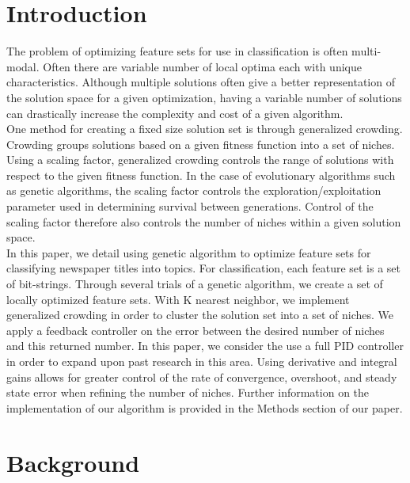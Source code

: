 \documentclass{sig-alternate}
\begin{document}


\section{Introduction}
The problem of optimizing feature sets for use in classification is often multi-modal. Often there are variable number of local optima each with unique characteristics. Although multiple solutions often give a better representation of the solution space for a given optimization, having a variable number of solutions can drastically increase the complexity and cost of a given algorithm.\\
\indent One method for creating a fixed size solution set is through generalized crowding. Crowding groups solutions based on a given fitness function into a set of niches\cite{ole:feedback}. Using a scaling factor, generalized crowding controls the range of solutions  with respect to the given fitness function. In the case of evolutionary algorithms such as genetic algorithms, the scaling factor controls the exploration/exploitation parameter used in determining survival between generations. Control of the scaling factor therefore also controls the number of niches within a given solution space\cite{ole:feedback}.\\
\indent In this paper, we detail using genetic algorithm to optimize feature sets for classifying newspaper titles into topics. For classification, each feature set is a set of bit-strings. Through several trials of a genetic algorithm, we create a set of locally optimized feature sets. With K nearest neighbor, we implement generalized crowding in order to cluster the solution set into a set of niches. We apply a feedback controller on the error between the desired number of niches and this returned number. In this paper, we consider the use a full PID controller in order to expand upon past research in this area. Using derivative and integral gains allows for greater control of the rate of convergence, overshoot, and steady state error when refining the number of  niches. Further information on the implementation of our algorithm is provided in the Methods section of our paper.  

\section{Background}
\end{document}

